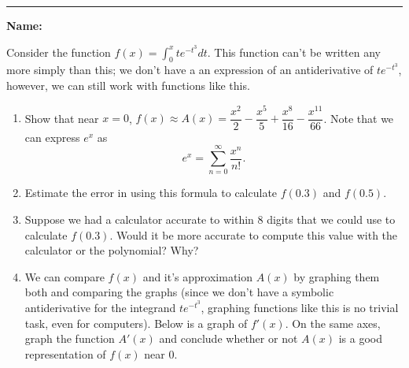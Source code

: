 \documentclass[11pt]{article}
\begin{document}
    \hrule
    \vspace{.5cm}
    \noindent\textbf{Name:} \underline{\qquad\qquad\qquad\qquad\qquad\qquad\qquad\qquad\qquad\qquad\qquad\qquad\qquad}

    Consider the function $f(x)=\int_{0}^{x}te^{-t^{3}}dt$. This function can't be written any more simply than this; we don't have a an expression of an antiderivative of $te^{-t^{3}}$, however, we can still work with functions like this.
    \begin{enumerate}
        \item Show that near $x=0$, $f(x)\approx A(x)=\dfrac{x^{2}}{2}-\dfrac{x^{5}}{5}+\dfrac{x^{8}}{16}-\dfrac{x^{11}}{66}$. Note that we can express $e^{x}$ as $$e^{x}=\sum_{n=0}^{\infty}\frac{x^{n}}{n!}.$$
        \vfill
        \item Estimate the error in using this formula to calculate $f(0.3)$ and $f(0.5)$.
        \vfill
        \newpage
        \item Suppose we had a calculator accurate to within 8 digits that we could use to calculate $f(0.3)$. Would it be more accurate to compute this value with the calculator or the polynomial? Why?
        \vfill
        \item We can compare $f(x)$ and it's approximation $A(x)$ by graphing them both and comparing the graphs (since we don't have a symbolic antiderivative for the integrand $te^{-t^{3}}$, graphing functions like this is no trivial task, even for computers). Below is a graph of $f'(x)$. On the same axes, graph the function $A'(x)$ and conclude whether or not $A(x)$ is a good representation of $f(x)$ near 0.
        
        \vfill
    \end{enumerate}
\end{document}
